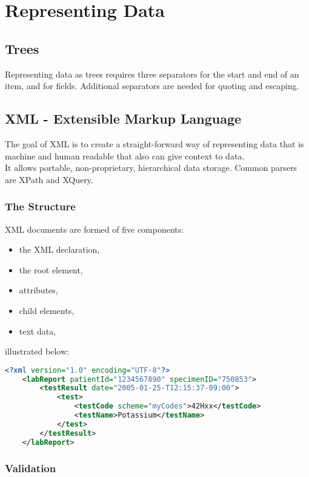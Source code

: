 \section{Representing Data}

\subsection{Trees}

Representing data as trees requires three separators for the
start and end of an item, and for fields. Additional
separators are needed for quoting and escaping.

\subsection{XML - Extensible Markup Language}

The goal of XML is to create a straight-forward way of 
representing data that is machine and human readable
that also can give context to data.
\\[\baselineskip]
It allows portable, non-proprietary, hierarchical data storage.
Common parsers are XPath and XQuery.

\subsubsection{The Structure}

XML documents are formed of five components: \begin{itemize}
    \item the XML declaration,
    \item the root element,
    \item attributes,
    \item child elements,
    \item text data,
\end{itemize} illustrated below: \begin{lstlisting}[language=XML]
    <?xml version="1.0" encoding="UTF-8"?>
    <labReport patientId="1234567890" specimenID="750853">
        <testResult date="2005-01-25-T12:15:37-09:00">
            <test>
                <testCode scheme="myCodes">42Hxx</testCode>
                <testName>Potassium</testName>
            </test>
        </testResult>
    </labReport>
\end{lstlisting}

\subsubsection{Validation}

